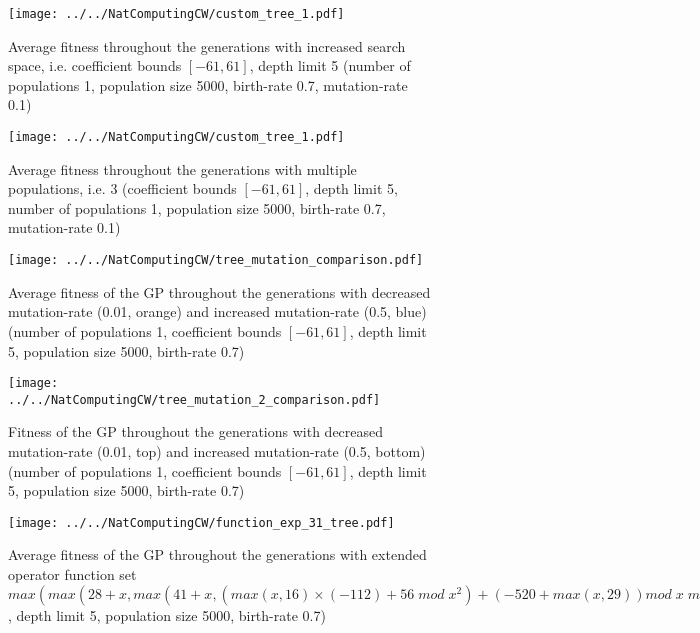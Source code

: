 \documentclass[11pt,a4paper]{article}
\begin{document}
\begin{appendices}
\begin{figure}[h]
\centering
\texttt{[image: ../../NatComputingCW/custom\_tree\_1.pdf]} 
\caption{Average fitness throughout the generations with increased search space, i.e. coefficient bounds $[-61, 61]$, depth limit 5 (number of populations 1, population size 5000, birth-rate 0.7, mutation-rate 0.1)}
\label{fig:custom_tree_1}
\end{figure}

\begin{figure}[h]
\centering
\texttt{[image: ../../NatComputingCW/custom\_tree\_1.pdf]} 
\caption{Average fitness throughout the generations with multiple populations, i.e. 3 (coefficient bounds $[-61, 61]$, depth limit 5, number of populations 1, population size 5000, birth-rate 0.7, mutation-rate 0.1)}
\label{fig:custom_tree_2}
\end{figure}

\begin{figure}[h]
\centering
\texttt{[image: ../../NatComputingCW/tree\_mutation\_comparison.pdf]} 
\caption{Average fitness of the GP throughout the generations with decreased mutation-rate (0.01, orange) and increased mutation-rate (0.5, blue) (number of populations 1, coefficient bounds $[-61, 61]$, depth limit 5, population size 5000, birth-rate 0.7)}
\label{fig:mutation_tree}
\end{figure}

\begin{figure}[h]
\centering
\texttt{[image: ../../NatComputingCW/tree\_mutation\_2\_comparison.pdf]} 
\caption{Fitness of the GP throughout the generations with decreased mutation-rate (0.01, top) and increased mutation-rate (0.5, bottom) (number of populations 1, coefficient bounds $[-61, 61]$, depth limit 5, population size 5000, birth-rate 0.7)}
\label{fig:mutation_tree_2}
\end{figure}

\begin{figure}[h]
\centering
\texttt{[image: ../../NatComputingCW/function\_exp\_31\_tree.pdf]} 
\caption{Average fitness of the GP throughout the generations with extended operator function set $max(max(28 + x, max(41 + x, (max(x, 16)×(-112) + 56 \;mod\; x^2) + (-520 + max(x, 29)) mod \; x \;mod \;2\; mod\; (51 x))) + x^2, max(15 x, x \;mod \;53 \;mod\; max(11, x)) + (x - 46))$ , depth limit 5, population size 5000, birth-rate 0.7)}
\label{fig:extension_function_1}
\end{figure}


\end{appendices}
\end{document}
